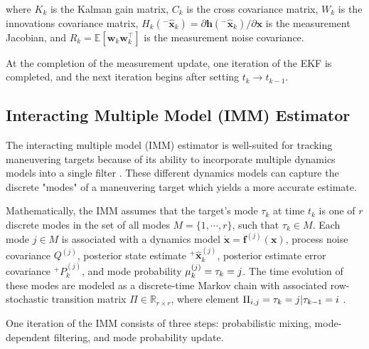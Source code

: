 \documentclass[letterpaper, preprint, paper,11pt]{AAS}	%
\newcommand{\R}{\mathbb{R}}
\newcommand{\E}{\mathbb{E}}
\let\P\relax\newcommand{\P}[1]{\mathbb{P}\left[#1\right]}
\begin{document}
\begin{enumerate}
    \noindent where $K_k$ is the Kalman gain matrix, $C_k$ is the cross covariance matrix, $W_k$ is the innovations covariance matrix, $H_k({}^-\bm{\hat{x}}_k) = \partial \bm{h}({}^-\hat{\bm{x}}_k)/\partial\bm{x}$ is the measurement Jacobian, and $R_k = \E[\bm{w}_k\bm{w}_k^\top]$ is the measurement noise covariance.

\end{enumerate}

At the completion of the measurement update, one iteration of the EKF is completed, and the next iteration begins after setting $ t_k \rightarrow t_{k-1}$. 

\subsection{Interacting Multiple Model (IMM) Estimator}

The interacting multiple model (IMM) estimator is well-suited for tracking maneuvering targets because of its ability to incorporate multiple dynamics models into a single filter \cite{bar2004estimation}. These different dynamics models can capture the discrete "modes" of a maneuvering target which yields a more accurate estimate. 

Mathematically, the IMM assumes that the target's mode $\tau_k$ at time $t_k$ is one of $r$ discrete modes in the set of all modes $M = \{1, \cdots, r\}$, such that $\tau_k \in M $. Each mode $j \in M$ is associated with a dynamics model $\dot{\bm{x}} = \bm{f}^{(j)}(\bm{x})$, process noise covariance $Q^{(j)}$, posterior state estimate ${}^+\hat{\bm{x}}_k^{(j)}$, posterior estimate error covariance ${}^+P_k^{(j)}$, and mode probability $\mu^{(j)}_k = \P{\tau_k = j}$. The time evolution of these modes are modeled as a discrete-time Markov chain with associated row-stochastic transition matrix $\Pi \in \R_{r \times r}$, where element $\Pi_{i, j} = \P{\tau_k=j | \tau_{k-1} = i}$ .

One iteration of the IMM consists of three steps: probabilistic mixing, mode-dependent filtering, and mode probability update.
\end{document}
